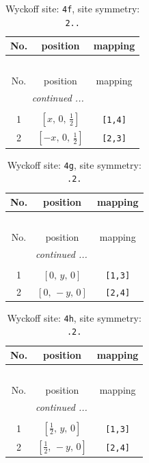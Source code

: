 \documentclass[fleqn,8pt]{jsarticle}
\begin{document}
\renewcommand{\arraystretch}{1.2}
\begin{longtable}{ccc}
\caption{Wyckoff site: {\tt 4f}, site symmetry: {\tt 2..}}
 \\
 \hline \hline
No. & position & mapping \\ \hline \endfirsthead

\multicolumn{2}{l}{\tablename\ \thetable{}} \\
 \hline \hline
No. & position & mapping \\ \hline \endhead

 \hline \hline
\multicolumn{2}{r}{\footnotesize\it continued ...} \\ \endfoot

 \hline \hline
\multicolumn{2}{r}{} \\ \endlastfoot

1 & $\left[ x,\, 0,\, \frac{1}{2} \right]$ & {\tt [1,4]} \\ \hline
2 & $\left[ - x,\, 0,\, \frac{1}{2} \right]$ & {\tt [2,3]} \\
\end{longtable}
\renewcommand{\arraystretch}{1.2}
\begin{longtable}{ccc}
\caption{Wyckoff site: {\tt 4g}, site symmetry: {\tt .2.}}
 \\
 \hline \hline
No. & position & mapping \\ \hline \endfirsthead

\multicolumn{2}{l}{\tablename\ \thetable{}} \\
 \hline \hline
No. & position & mapping \\ \hline \endhead

 \hline \hline
\multicolumn{2}{r}{\footnotesize\it continued ...} \\ \endfoot

 \hline \hline
\multicolumn{2}{r}{} \\ \endlastfoot

1 & $\left[ 0,\, y,\, 0 \right]$ & {\tt [1,3]} \\ \hline
2 & $\left[ 0,\, - y,\, 0 \right]$ & {\tt [2,4]} \\
\end{longtable}
\renewcommand{\arraystretch}{1.2}
\begin{longtable}{ccc}
\caption{Wyckoff site: {\tt 4h}, site symmetry: {\tt .2.}}
 \\
 \hline \hline
No. & position & mapping \\ \hline \endfirsthead

\multicolumn{2}{l}{\tablename\ \thetable{}} \\
 \hline \hline
No. & position & mapping \\ \hline \endhead

 \hline \hline
\multicolumn{2}{r}{\footnotesize\it continued ...} \\ \endfoot

 \hline \hline
\multicolumn{2}{r}{} \\ \endlastfoot

1 & $\left[ \frac{1}{2},\, y,\, 0 \right]$ & {\tt [1,3]} \\ \hline
2 & $\left[ \frac{1}{2},\, - y,\, 0 \right]$ & {\tt [2,4]} \\
\end{longtable}
\end{document}
